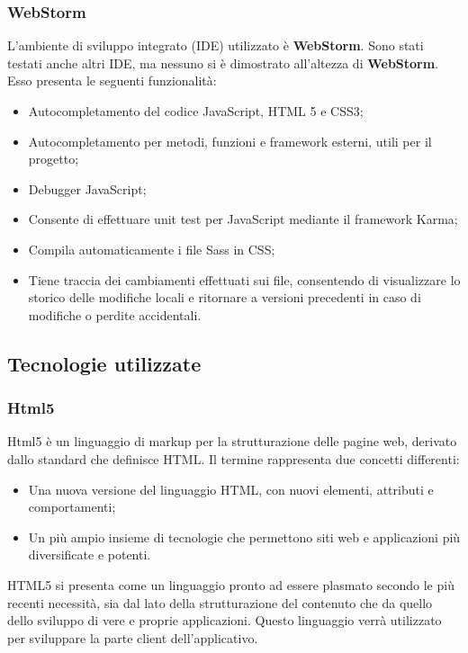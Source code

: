\subsubsection{WebStorm}
L'ambiente di sviluppo integrato (IDE) utilizzato è \textbf{WebStorm}. Sono stati testati anche altri IDE, ma nessuno si è dimostrato all'altezza di \textbf{WebStorm}. Esso presenta le seguenti funzionalità:
\begin{itemize}
\item
Autocompletamento del codice JavaScript, HTML 5 e CSS3;
\item
Autocompletamento per metodi, funzioni e framework esterni, utili per il progetto;
\item
Debugger JavaScript;
\item
Consente di effettuare unit test per JavaScript mediante il framework Karma;
\item
Compila automaticamente i file Sass in CSS;
\item
Tiene traccia dei cambiamenti effettuati sui file, consentendo di visualizzare lo storico delle modifiche locali e ritornare a versioni precedenti in caso di modifiche o perdite accidentali.
\end{itemize}


\subsection{Tecnologie utilizzate}
\subsubsection{Html5}
Html5 è un linguaggio di markup per la strutturazione delle pagine web, derivato dallo standard che definisce HTML.
Il termine rappresenta due concetti differenti:
\begin{itemize}
		\item
			Una nuova versione del linguaggio HTML, con nuovi elementi, attributi e comportamenti;
		\item
			Un più ampio insieme di tecnologie che permettono siti web e applicazioni più diversificate e potenti.
\end{itemize}
HTML5 si presenta come un linguaggio pronto ad essere plasmato secondo le più recenti necessità, sia dal lato della strutturazione del contenuto che da quello dello sviluppo di vere e proprie applicazioni.
Questo linguaggio verrà utilizzato per sviluppare la parte client dell'applicativo.


